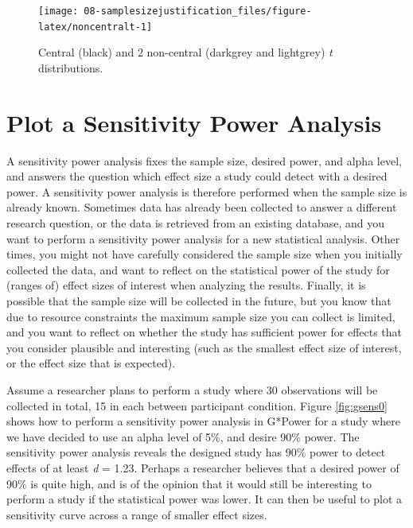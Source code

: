 \documentclass[
  oneside]{book}
\begin{document}
\begin{figure}

{\centering \texttt{[image: 08-samplesizejustification\_files/figure-latex/noncentralt-1]} 

}

\caption{Central (black) and 2 non-central (darkgrey and lightgrey) \emph{t} distributions.}\label{fig:noncentralt}
\end{figure}

\hypertarget{plot-a-sensitivity-power-analysis}{%
\section{Plot a Sensitivity Power Analysis}\label{plot-a-sensitivity-power-analysis}}

A sensitivity power analysis fixes the sample size, desired power, and alpha level, and answers the question which effect size a study could detect with a desired power. A sensitivity power analysis is therefore performed when the sample size is already known. Sometimes data has already been collected to answer a different research question, or the data is retrieved from an existing database, and you want to perform a sensitivity power analysis for a new statistical analysis. Other times, you might not have carefully considered the sample size when you initially collected the data, and want to reflect on the statistical power of the study for (ranges of) effect sizes of interest when analyzing the results. Finally, it is possible that the sample size will be collected in the future, but you know that due to resource constraints the maximum sample size you can collect is limited, and you want to reflect on whether the study has sufficient power for effects that you consider plausible and interesting (such as the smallest effect size of interest, or the effect size that is expected).

Assume a researcher plans to perform a study where 30 observations will be collected in total, 15 in each between participant condition. Figure \ref{fig:gsens0} shows how to perform a sensitivity power analysis in G*Power for a study where we have decided to use an alpha level of 5\%, and desire 90\% power. The sensitivity power analysis reveals the designed study has 90\% power to detect effects of at least \emph{d} = 1.23. Perhaps a researcher believes that a desired power of 90\% is quite high, and is of the opinion that it would still be interesting to perform a study if the statistical power was lower. It can then be useful to plot a sensitivity curve across a range of smaller effect sizes.
\end{document}
